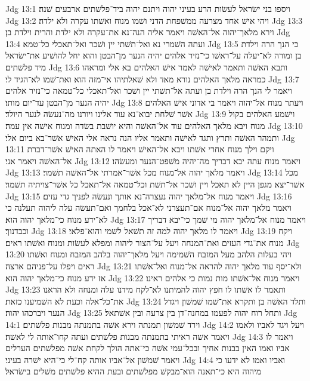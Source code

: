 Jdg 13:1  ויספו בני ישׂראל לעשׂות הרע בעיני יהוה ויתנם יהוה ביד־פלשׁתים ארבעים שׁנה׃
Jdg 13:2  ויהי אישׁ אחד מצרעה ממשׁפחת הדני ושׁמו מנוח ואשׁתו עקרה ולא ילדה׃
Jdg 13:3  וירא מלאך־יהוה אל־האשׁה ויאמר אליה הנה־נא את־עקרה ולא ילדת והרית וילדת בן׃
Jdg 13:4  ועתה השׁמרי נא ואל־תשׁתי יין ושׁכר ואל־תאכלי כל־טמא׃
Jdg 13:5  כי הנך הרה וילדת בן ומורה לא־יעלה על־ראשׁו כי־נזיר אלהים יהיה הנער מן־הבטן והוא יחל להושׁיע את־ישׂראל מיד פלשׁתים׃
Jdg 13:6  ותבא האשׁה ותאמר לאישׁה לאמר אישׁ האלהים בא אלי ומראהו כמראה מלאך האלהים נורא מאד ולא שׁאלתיהו אי־מזה הוא ואת־שׁמו לא־הגיד לי׃
Jdg 13:7  ויאמר לי הנך הרה וילדת בן ועתה אל־תשׁתי יין ושׁכר ואל־תאכלי כל־טמאה כי־נזיר אלהים יהיה הנער מן־הבטן עד־יום מותו׃
Jdg 13:8  ויעתר מנוח אל־יהוה ויאמר בי אדוני אישׁ האלהים אשׁר שׁלחת יבוא־נא עוד אלינו ויורנו מה־נעשׂה לנער היולד׃
Jdg 13:9  וישׁמע האלהים בקול מנוח ויבא מלאך האלהים עוד אל־האשׁה והיא יושׁבת בשׂדה ומנוח אישׁה אין עמה׃
Jdg 13:10  ותמהר האשׁה ותרץ ותגד לאישׁה ותאמר אליו הנה נראה אלי האישׁ אשׁר־בא ביום אלי׃
Jdg 13:11  ויקם וילך מנוח אחרי אשׁתו ויבא אל־האישׁ ויאמר לו האתה האישׁ אשׁר־דברת אל־האשׁה ויאמר אני׃
Jdg 13:12  ויאמר מנוח עתה יבא דבריך מה־יהיה משׁפט־הנער ומעשׂהו׃
Jdg 13:13  ויאמר מלאך יהוה אל־מנוח מכל אשׁר־אמרתי אל־האשׁה תשׁמר׃
Jdg 13:14  מכל אשׁר־יצא מגפן היין לא תאכל ויין ושׁכר אל־תשׁת וכל־טמאה אל־תאכל כל אשׁר־צויתיה תשׁמר׃
Jdg 13:15  ויאמר מנוח אל־מלאך יהוה נעצרה־נא אותך ונעשׂה לפניך גדי עזים׃
Jdg 13:16  ויאמר מלאך יהוה אל־מנוח אם־תעצרני לא־אכל בלחמך ואם־תעשׂה עלה ליהוה תעלנה כי לא־ידע מנוח כי־מלאך יהוה הוא׃
Jdg 13:17  ויאמר מנוח אל־מלאך יהוה מי שׁמך כי־יבא דבריך וכבדנוך׃
Jdg 13:18  ויאמר לו מלאך יהוה למה זה תשׁאל לשׁמי והוא־פלאי׃
Jdg 13:19  ויקח מנוח את־גדי העזים ואת־המנחה ויעל על־הצור ליהוה ומפלא לעשׂות ומנוח ואשׁתו ראים׃
Jdg 13:20  ויהי בעלות הלהב מעל המזבח השׁמימה ויעל מלאך־יהוה בלהב המזבח ומנוח ואשׁתו ראים ויפלו על־פניהם ארצה׃
Jdg 13:21  ולא־יסף עוד מלאך יהוה להראה אל־מנוח ואל־אשׁתו אז ידע מנוח כי־מלאך יהוה הוא׃
Jdg 13:22  ויאמר מנוח אל־אשׁתו מות נמות כי אלהים ראינו׃
Jdg 13:23  ותאמר לו אשׁתו לו חפץ יהוה להמיתנו לא־לקח מידנו עלה ומנחה ולא הראנו את־כל־אלה וכעת לא השׁמיענו כזאת׃
Jdg 13:24  ותלד האשׁה בן ותקרא את־שׁמו שׁמשׁון ויגדל הנער ויברכהו יהוה׃
Jdg 13:25  ותחל רוח יהוה לפעמו במחנה־דן בין צרעה ובין אשׁתאל׃
Jdg 14:1  וירד שׁמשׁון תמנתה וירא אשׁה בתמנתה מבנות פלשׁתים׃
Jdg 14:2  ויעל ויגד לאביו ולאמו ויאמר אשׁה ראיתי בתמנתה מבנות פלשׁתים ועתה קחו־אותה לי לאשׁה׃
Jdg 14:3  ויאמר לו אביו ואמו האין בבנות אחיך ובכל־עמי אשׁה כי־אתה הולך לקחת אשׁה מפלשׁתים הערלים ויאמר שׁמשׁון אל־אביו אותה קח־לי כי־היא ישׁרה בעיני׃
Jdg 14:4  ואביו ואמו לא ידעו כי מיהוה היא כי־תאנה הוא־מבקשׁ מפלשׁתים ובעת ההיא פלשׁתים משׁלים בישׂראל׃
